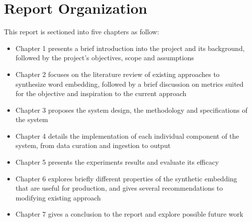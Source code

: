 \newpage

\section{Report Organization}

This report is sectioned into five chapters as follow:
\begin{itemize}
    \item Chapter 1 presents a brief introduction into the project and its background, followed by the project's objectives, scope and assumptions
    \item Chapter 2 focuses on the literature review of existing approaches to synthesize word embedding, followed by a brief discussion on metrics suited for the objective and inspiration to the current approach
    \item Chapter 3 proposes the system design, the methodology and specifications of the system
    \item Chapter 4 details the implementation of each individual component of the system, from data curation and ingestion to output
    \item Chapter 5 presents the experiments results and evaluate its efficacy 
    \item Chapter 6 explores briefly different properties of the synthetic embedding that are useful for production, and gives several recommendations to modifying existing approach
    \item Chapter 7 gives a conclusion to the report and explore possible future work
\end{itemize}


